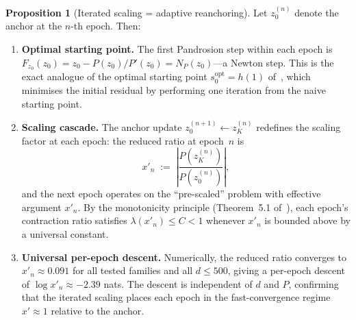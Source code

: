\documentclass[11pt,a4paper]{article}
\theoremstyle{definition}
\newtheorem{proposition}{Proposition}[section]
\begin{document}
\begin{proposition}[Iterated scaling = adaptive reanchoring]
\label{prop:iterated_scaling}
Let $z_0^{(n)}$ denote the anchor at the $n$-th epoch.  Then:
\begin{enumerate}
  \item[\textup{(i)}] \textbf{Optimal starting point.}  The first Pandrosion step within each epoch is $F_{z_0}(z_0) = z_0 - P(z_0)/P'(z_0) = N_P(z_0)$---a Newton step.  This is the exact analogue of the optimal starting point $s_0^{\mathrm{opt}} = h(1)$ of~\cite{besevic2026}, which minimises the initial residual by performing one iteration from the naive starting point.
  \item[\textup{(ii)}] \textbf{Scaling cascade.}  The anchor update $z_0^{(n+1)} \leftarrow z_K^{(n)}$ redefines the scaling factor at each epoch: the reduced ratio at epoch~$n$ is
  \begin{equation}
    \label{eq:reduced_ratio}
    x'_n \;:=\; \left|\frac{P(z_K^{(n)})}{P(z_0^{(n)})}\right|,
  \end{equation}
  and the next epoch operates on the ``pre-scaled'' problem with effective argument $x'_n$.  By the monotonicity principle (Theorem~5.1 of~\cite{besevic2026}), each epoch's contraction ratio satisfies $\lambda(x'_n) \leq C < 1$ whenever $x'_n$ is bounded above by a universal constant.
  \item[\textup{(iii)}] \textbf{Universal per-epoch descent.}  Numerically, the reduced ratio converges to $x'_n \approx 0.091$ for all tested families and all $d \leq 500$, giving a per-epoch descent of $\log x'_n \approx -2.39$ nats.  The descent is independent of $d$ and $P$, confirming that the iterated scaling places each epoch in the fast-convergence regime $x' \approx 1$ relative to the anchor.
\end{enumerate}
\end{proposition}
\end{document}
